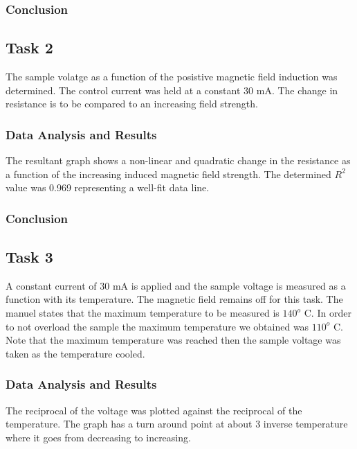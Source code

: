 \documentclass[a4paper]{article}
\begin{document}
\subsubsection{Conclusion}

\subsection{Task 2}

\qq The sample volatge as a function of the posistive magnetic field
induction was determined. The control current was held at a constant
30 mA. The change in resistance is to be compared to an increasing
field strength.

\subsubsection{Data Analysis and Results}
\qq The resultant graph shows a non-linear and quadratic change in the
resistance as a function of the increasing induced magnetic field
strength. The determined $R^2$ value was 0.969 representing a well-fit
data line.

\subsubsection{Conclusion}

\subsection{Task 3}

\qq A constant current of 30 mA is applied and the sample voltage is
measured as a function with its temperature. The magnetic field
remains off for this task. The manuel states that the maximum
temperature to be measured is $140^o$ C. In order to not overload the
sample the maximum temperature we obtained was $110^o$ C. Note that the
maximum temperature was reached then the sample voltage was taken as
the temperature cooled.

\subsubsection{Data Analysis and Results}
\qq The reciprocal of the voltage was plotted against the reciprocal
of the temperature. The graph has a turn around point at about 3
inverse temperature where it goes from decreasing to increasing.
\end{document}
